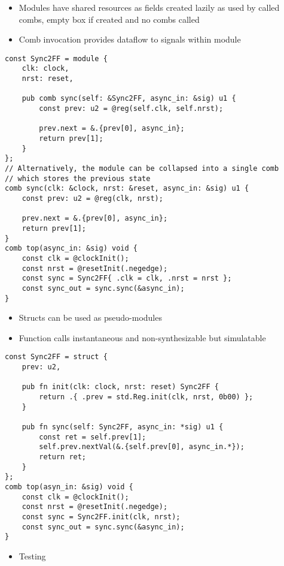 \documentclass[10pt]{article}
\begin{document}
\begin{itemize}
	\item Modules have shared resources as fields created lazily as used by called combs, empty box if created and no combs called
	\item Comb invocation provides dataflow to signals within module
\end{itemize}

\begin{verbatim}
const Sync2FF = module {
    clk: clock,
    nrst: reset,

    pub comb sync(self: &Sync2FF, async_in: &sig) u1 {
        const prev: u2 = @reg(self.clk, self.nrst);

        prev.next = &.{prev[0], async_in};
        return prev[1];
    }
};
// Alternatively, the module can be collapsed into a single comb
// which stores the previous state
comb sync(clk: &clock, nrst: &reset, async_in: &sig) u1 {
    const prev: u2 = @reg(clk, nrst);

    prev.next = &.{prev[0], async_in};
    return prev[1];
}
comb top(async_in: &sig) void {
    const clk = @clockInit();
    const nrst = @resetInit(.negedge);
    const sync = Sync2FF{ .clk = clk, .nrst = nrst };
    const sync_out = sync.sync(&async_in);
}
\end{verbatim}

\begin{itemize}
	\item Structs can be used as pseudo-modules
	\item Function calls instantaneous and non-synthesizable but simulatable
\end{itemize}

\begin{verbatim}
const Sync2FF = struct {
    prev: u2,

    pub fn init(clk: clock, nrst: reset) Sync2FF {
        return .{ .prev = std.Reg.init(clk, nrst, 0b00) };
    }

    pub fn sync(self: Sync2FF, async_in: *sig) u1 {
        const ret = self.prev[1];
        self.prev.nextVal(&.{self.prev[0], async_in.*});
        return ret;
    }
};
comb top(asyn_in: &sig) void {
    const clk = @clockInit();
    const nrst = @resetInit(.negedge);
    const sync = Sync2FF.init(clk, nrst);
    const sync_out = sync.sync(&async_in);
}
\end{verbatim}

\begin{itemize}
	\item Testing
\end{itemize}
\end{document}
